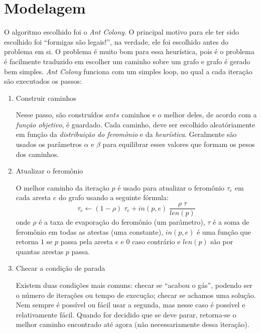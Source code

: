 \documentclass{article}
\begin{document}
\section{Modelagem}

O algoritmo escolhido foi o \emph{Ant Colony}.
O principal motivo para ele ter sido escolhido
foi ``formigas são legais!'',
na verdade, ele foi escolhido antes do problema em si.
O problema é muito bom para essa heurística,
pois é o problema é facilmente traduzido
em escolher um caminho sobre um grafo e
grafo é gerado bem simples.
\emph{Ant Colony} funciona com um simples loop,
no qual a cada iteração são executados os passos:
\begin{enumerate}
    \item Construir caminhos \par
        Nesse passo, são construídos \(ants\) caminhos e
        o melhor deles, de acordo com a \emph{função objetivo},
        é guardado.
        Cada caminho, deve ser escolhido aleatóriamente
        em função da \emph{distribuição do feromônio} e
        da \emph{heurística}.
        Geralmente são usados os parâmetros \(\alpha\) e \(\beta\)
        para equilibrar esses valores
        que formam os pesos dos caminhos.
    \item Atualizar o feromônio \par
        O melhor caminho da iteração \(p\) é usado
        para atualizar
        o feromônio \(\tau_e\) em cada aresta \(e\) do grafo
        usando a seguinte fórmula:
        \[
            \tau_e \leftarrow
                (1 - \rho) \; \tau_e
                + in(p, e) \; \frac{\rho \; \tau}{len(p)}
        \]
        onde \(\rho\) é a taxa de evaporação do feromônio
        (um parâmetro),
        \(\tau\) é a soma de feromônio em todas as atestas
        (uma constante),
        \(in(p, e)\) é uma função que retorna \(1\) se
        \(p\) passa pela aresta \(e\) e \(0\) caso contrário e
        \(len(p)\) são por quantas arestas \(p\) passa.
    \item Checar a condição de parada \par
        Existem duas condições mais comuns:
        checar se ``acabou o gás'',
        podendo ser o número de iterações ou tempo de execução;
        checar se achamos uma solução.
        Nem sempre é possível ou fácil usar a segunda,
        mas nesse caso é possível e relativamente fácil.
        Quando for decidido que se deve parar,
        retorna-se o melhor caminho encontrado até agora
        (não necessariamente dessa iteração).
\end{enumerate}
\end{document}

